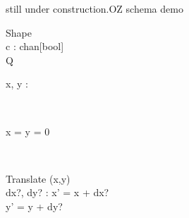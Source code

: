 still under construction.OZ schema demo
\begin{class}{Shape}
\\c : chan[bool]
\\Q{}
\\
\begin{state}
x, y : \real
\end{state} 
\\
\begin{init}
x = y = 0
\end{init} 
\\
\begin{op}{Translate}
\Delta (x,y)
\\
dx?, dy? : \real
\ST
x' = x + dx?
\\y' = y + dy?
\end{op}\end{class}
\newpage %
